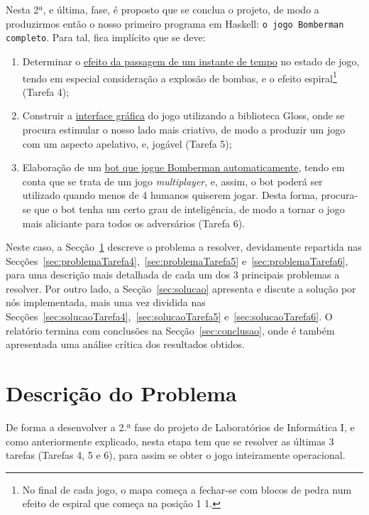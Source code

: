 \documentclass[a4paper]{article}
\begin{document}
Nesta 2ª, e última, fase, é proposto que se conclua o projeto, de modo a 
produzirmos então o nosso primeiro programa em Haskell: \texttt{o jogo Bomberman completo}. 
Para tal, fica implícito que se deve:

\begin{enumerate}
	\item Determinar o \underline{efeito da passagem de um instante de tempo} no estado de jogo, 
	tendo em especial consideração a explosão de bombas, e o efeito espiral\footnote{No final de cada jogo,
  o mapa começa a fechar-se com blocos de pedra num efeito de espiral que começa na posição 1 1.} (Tarefa 4);
	\item Construir a \underline{interface gráfica} do jogo utilizando a biblioteca Gloss, onde 
	se procura estimular o nosso lado mais criativo, de modo a produzir um jogo com um aspecto 
	apelativo, e, jogável (Tarefa 5);
	\item Elaboração de um \underline{bot que jogue Bomberman automaticamente}, tendo em conta que se 
	trata de um jogo \textit{multiplayer}, e, assim, o bot poderá ser utilizado quando menos de 4 humanos 
	quiserem jogar. Desta forma, procura-se que o bot tenha um certo grau de inteligência, de modo a 
	tornar o jogo mais aliciante para todos os adversários (Tarefa 6).
\end{enumerate}

Neste caso, a Secção~\ref{sec:problema} descreve o problema a resolver, devidamente 
repartida nas Secções~\ref{sec:problemaTarefa4},~\ref{sec:problemaTarefa5} e~\ref{sec:problemaTarefa6}, 
para uma descrição mais detalhada de cada um dos 3 principais problemas a resolver. Por outro 
lado, a Secção~\ref{sec:solucao} apresenta e discute a solução por nós implementada, mais uma 
vez dividida nas Secções~\ref{sec:solucaoTarefa4},~\ref{sec:solucaoTarefa5} e~\ref{sec:solucaoTarefa6}. 
O relatório termina com conclusões na Secção~\ref{sec:conclusao}, onde é também apresentada
uma análise crítica dos resultados obtidos.

\section{Descrição do Problema}
\label{sec:problema}

De forma a desenvolver a 2.ª fase do projeto de Laboratórios de 
Informática I, e como anteriormente explicado, nesta etapa tem que se 
resolver as últimas 3 tarefas (Tarefas 4, 5 e 6), para assim se obter o 
jogo inteiramente operacional.
\end{document}
